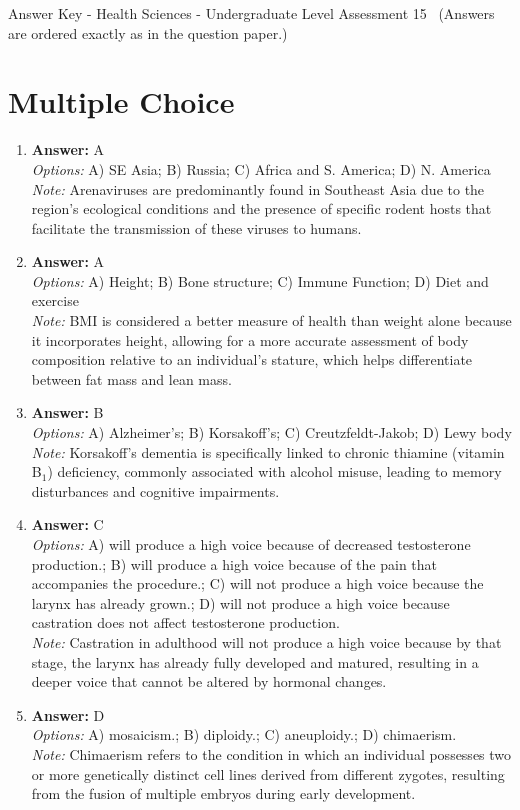 \documentclass[12pt]{article}
\begin{document}
\begin{center}
Answer Key - Health Sciences - Undergraduate Level Assessment 15 \
\small (Answers are ordered exactly as in the question paper.)
\end{center}

\section*{Multiple Choice}
\begin{enumerate}[label=\arabic*.]
\item \textbf{Answer:} A
\\ \textit{Options:} A) SE Asia; B) Russia; C) Africa and S. America; D) N. America
\\ \textit{Note:} Arenaviruses are predominantly found in Southeast Asia due to the region's ecological conditions and the presence of specific rodent hosts that facilitate the transmission of these viruses to humans.
\item \textbf{Answer:} A
\\ \textit{Options:} A) Height; B) Bone structure; C) Immune Function; D) Diet and exercise
\\ \textit{Note:} BMI is considered a better measure of health than weight alone because it incorporates height, allowing for a more accurate assessment of body composition relative to an individual's stature, which helps differentiate between fat mass and lean mass.
\item \textbf{Answer:} B
\\ \textit{Options:} A) Alzheimer's; B) Korsakoff's; C) Creutzfeldt-Jakob; D) Lewy body
\\ \textit{Note:} Korsakoff's dementia is specifically linked to chronic thiamine (vitamin B$_{1}$) deficiency, commonly associated with alcohol misuse, leading to memory disturbances and cognitive impairments.
\item \textbf{Answer:} C
\\ \textit{Options:} A) will produce a high voice because of decreased testosterone production.; B) will produce a high voice because of the pain that accompanies the procedure.; C) will not produce a high voice because the larynx has already grown.; D) will not produce a high voice because castration does not affect testosterone production.
\\ \textit{Note:} Castration in adulthood will not produce a high voice because by that stage, the larynx has already fully developed and matured, resulting in a deeper voice that cannot be altered by hormonal changes.
\item \textbf{Answer:} D
\\ \textit{Options:} A) mosaicism.; B) diploidy.; C) aneuploidy.; D) chimaerism.
\\ \textit{Note:} Chimaerism refers to the condition in which an individual possesses two or more genetically distinct cell lines derived from different zygotes, resulting from the fusion of multiple embryos during early development.
\end{enumerate}
\end{document}
